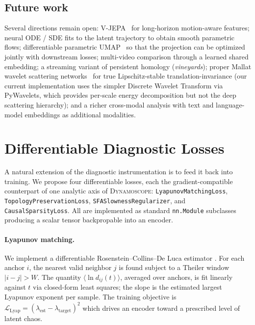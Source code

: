 \documentclass[11pt,a4paper]{article}
\begin{document}
\subsection{Future work}

Several directions remain open: V-JEPA~\cite{bardes2024vjepa} for
long-horizon motion-aware features; neural ODE / SDE fits to the
latent trajectory to obtain smooth parametric flows; differentiable
parametric UMAP~\cite{sainburg2021parametric} so that the projection
can be optimized jointly with downstream losses; multi-video
comparison through a learned shared embedding; a streaming variant
of persistent homology (\emph{vineyards}); proper Mallat wavelet
scattering networks~\cite{mallat2012scattering} for true
Lipschitz-stable translation-invariance (our current implementation
uses the simpler Discrete Wavelet Transform via PyWavelets, which
provides per-scale energy decomposition but not the deep
scattering hierarchy); and a richer cross-modal analysis with text
and language-model embeddings as additional modalities.

\section{Differentiable Diagnostic Losses}
\label{sec:losses}

A natural extension of the diagnostic instrumentation is to feed it
back into training. We propose four differentiable losses, each
the gradient-compatible counterpart of one analytic axis of
\textsc{Dynamoscope}: \texttt{LyapunovMatchingLoss},
\texttt{TopologyPreservationLoss},
\texttt{SFASlownessRegularizer}, and \texttt{CausalSparsityLoss}.
All are implemented as standard \texttt{nn.Module} subclasses
producing a scalar tensor backpropable into an encoder.

\paragraph{Lyapunov matching.}
We implement a differentiable Rosenstein--Collins--De Luca estimator
\cite{rosenstein1993}. For each anchor $i$, the nearest valid
neighbor $j$ is found subject to a Theiler window $|i-j|>W$. The
quantity $\langle \ln d_{ij}(t) \rangle$, averaged over anchors, is
fit linearly against $t$ via closed-form least squares; the slope is
the estimated largest Lyapunov exponent per sample. The training
objective is $\mathcal{L}_{\text{Lyap}} = (\lambda_{\text{est}} -
\lambda_{\text{target}})^2$ which drives an encoder toward a
prescribed level of latent chaos.
\end{document}
